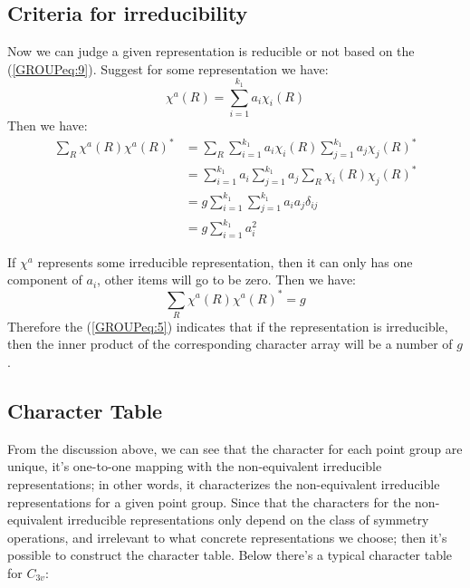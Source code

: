 \subsection{Criteria for irreducibility}
%
%
%
%
Now we can judge a given representation is reducible or not based on
the (\ref{GROUPeq:9}). Suggest for some representation we have:
\begin{equation}\label{}
  \chi^{a}(R) = \sum_{i=1}^{k_{1}}a_{i}\chi_{i}(R)
\end{equation}
Then we have:
\begin{align}\label{}
  \sum_{R}\chi^{a}(R)\chi^{a}(R)^{*} &=
  \sum_{R}\sum_{i=1}^{k_{1}}a_{i}\chi_{i}(R)\sum_{j=1}^{k_{1}}a_{j}\chi_{j}(R)^{*} \nonumber \\
  &=\sum_{i=1}^{k_{1}}a_{i}\sum_{j=1}^{k_{1}}a_{j}\sum_{R}\chi_{i}(R)\chi_{j}(R)^{*} \nonumber \\
  &= g\sum_{i=1}^{k_{1}}\sum_{j=1}^{k_{1}}a_{i}a_{j}\delta_{ij} \nonumber \\
  &= g\sum_{i=1}^{k_{1}}a_{i}^{2}
\end{align}

If $\chi^{a}$ represents some irreducible representation, then it can
only has one component of $a_{i}$, other items will go to be
zero. Then we have:
\begin{equation}\label{GROUPeq:5}
  \sum_{R}\chi^{a}(R)\chi^{a}(R)^{*}  = g
\end{equation}
Therefore the (\ref{GROUPeq:5}) indicates that if the representation
is irreducible, then the inner product of the corresponding character
array will be a number of $g$.

\subsection{Character Table}
%
%

From the discussion above, we can see that the character for each
point group are unique, it's one-to-one mapping with the
non-equivalent irreducible representations; in other words, it
characterizes the non-equivalent irreducible representations for a
given point group. Since that the characters for the non-equivalent
irreducible representations only depend on the class of symmetry
operations, and irrelevant to what concrete representations we choose;
then it's possible to construct the character table. Below there's a
typical character table for $C_{3v}$:

